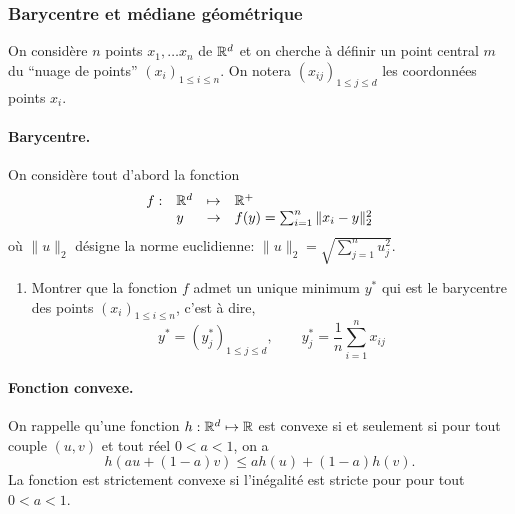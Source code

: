 \subsubsection{Barycentre et médiane géométrique}

On considère $n$ points $x_1, \dots x_n$ de $\mathbb{R}^d$ et on cherche à définir un point central $m$ du ``nuage de points'' $(x_i)_{1 \leq i \leq n}$. On notera $(x_{ij})_{1 \leq j \leq d}$ les coordonnées points $x_i$. 

\paragraph{Barycentre.}
On considère tout d'abord la fonction
$$
\begin{array}{rlcl}
  f: & \mathbb{R}^d & \mapsto & \mathbb{R}^+ \\
  & y & \to & f(y) = \sum_{i=1}^n \|x_i - y\|_2^2
  \end{array}
$$
où $\|u\|_2$ désigne la norme euclidienne: $\|u\|_2 = \sqrt{\sum_{j=1}^n u_j^2}$.

\begin{enumerate}
  \item Montrer que la fonction $f$ admet un unique minimum $y^*$ qui est le barycentre des points $(x_i)_{1 \leq i \leq n}$, c'est à dire, 
  $$
  y^* = (y^*_j)_{1 \leq j \leq d}, 
  \qquad
  y^*_j = \frac1n \sum_{i=1}^n x_{ij}
  $$
\end{enumerate}

\paragraph{Fonction convexe.}
On rappelle qu'une fonction $h: \mathbb{R}^d \mapsto \mathbb{R}$ est convexe si et seulement si pour tout couple $(u, v)$ et tout réel $0 < a < 1$, on a
$$
h(au + (1-a) v) \leq a h(u) + (1-a) h(v).
$$
La fonction est strictement convexe si l'inégalité est stricte pour pour tout $0 < a < 1$.

